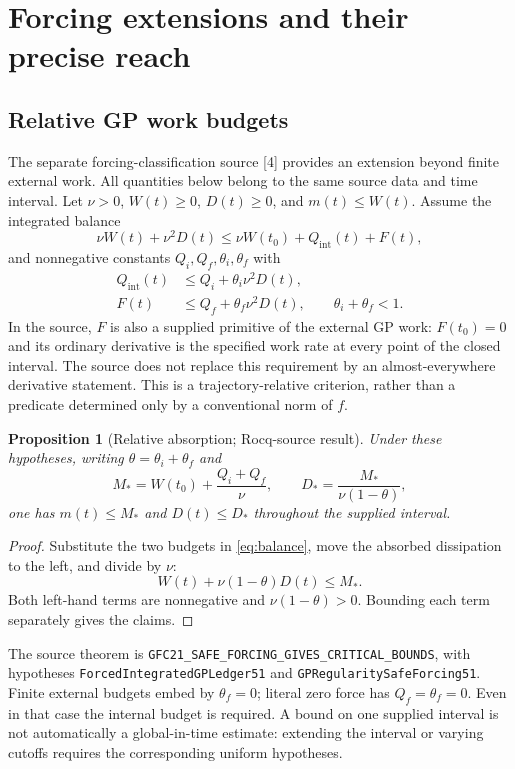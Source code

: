 \documentclass[11pt,a4paper]{article}
\newtheorem{proposition}{Proposition}[section]
\theoremstyle{remark}\newtheorem{remark}[proposition]{Remark}
\newcommand{\code}[1]{\nolinkurl{#1}}
\newcommand{\rocq}{\textsf{Rocq-source result}}
\begin{document}
\section{Forcing extensions and their precise reach}
\subsection{Relative GP work budgets}
The separate forcing-classification source [4] provides an extension beyond finite external work. All quantities below belong to the same source data and time interval. Let $\nu>0$, $W(t)\ge0$, $D(t)\ge0$, and $m(t)\le W(t)$. Assume the integrated balance
\begin{equation}\label{eq:balance}
 \nu W(t)+\nu^2D(t)
 \le\nu W(t_0)+Q_{\mathrm{int}}(t)+F(t),
\end{equation}
and nonnegative constants $Q_i,Q_f,\theta_i,\theta_f$ with
\begin{align}
 Q_{\mathrm{int}}(t)&\le Q_i+\theta_i\nu^2D(t),\\
 F(t)&\le Q_f+\theta_f\nu^2D(t),\qquad
 \theta_i+\theta_f<1.\label{eq:margin}
\end{align}
In the source, $F$ is also a supplied primitive of the external GP work: $F(t_0)=0$ and its ordinary derivative is the specified work rate at every point of the closed interval. The source does not replace this requirement by an almost-everywhere derivative statement. This is a trajectory-relative criterion, rather than a predicate determined only by a conventional norm of $f$.

\begin{proposition}[Relative absorption; \rocq]\label{prop:gp}
Under these hypotheses, writing $\theta=\theta_i+\theta_f$ and
\[
 M_* =W(t_0)+\frac{Q_i+Q_f}{\nu},
 \qquad D_* =\frac{M_*}{\nu(1-\theta)},
\]
one has $m(t)\le M_*$ and $D(t)\le D_*$ throughout the supplied interval.
\end{proposition}
\begin{proof}
Substitute the two budgets in \eqref{eq:balance}, move the absorbed dissipation to the left, and divide by $\nu$:
\[
 W(t)+\nu(1-\theta)D(t)\le M_*.
\]
Both left-hand terms are nonnegative and $\nu(1-\theta)>0$. Bounding each term separately gives the claims.
\end{proof}
The source theorem is \code{GFC21_SAFE_FORCING_GIVES_CRITICAL_BOUNDS}, with hypotheses \code{ForcedIntegratedGPLedger51} and \code{GPRegularitySafeForcing51}. Finite external budgets embed by $\theta_f=0$; literal zero force has $Q_f=\theta_f=0$. Even in that case the internal budget is required. A bound on one supplied interval is not automatically a global-in-time estimate: extending the interval or varying cutoffs requires the corresponding uniform hypotheses.
\end{document}
